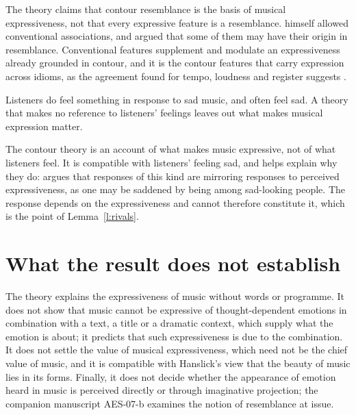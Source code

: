\documentclass{situationist-preprint}
\begin{document}
\begin{reply}
The theory claims that contour resemblance is the basis of musical expressiveness, not that every expressive feature is a resemblance. \citet{Kivy1980} himself allowed conventional associations, and argued that some of them may have their origin in resemblance. Conventional features supplement and modulate an expressiveness already grounded in contour, and it is the contour features that carry expression across idioms, as the agreement found for tempo, loudness and register suggests \citep{JuslinLaukka2003}.
\end{reply}

\begin{objection}\label{o:felt}
Listeners do feel something in response to sad music, and often feel sad. A theory that makes no reference to listeners' feelings leaves out what makes musical expression matter.
\end{objection}

\begin{reply}
The contour theory is an account of what makes music expressive, not of what listeners feel. It is compatible with listeners' feeling sad, and helps explain why they do: \citet{SDavies1994} argues that responses of this kind are mirroring responses to perceived expressiveness, as one may be saddened by being among sad-looking people. The response depends on the expressiveness and cannot therefore constitute it, which is the point of Lemma~\ref{l:rivals}.
\end{reply}

\section{What the result does not establish}

The theory explains the expressiveness of music without words or programme. It does not show that music cannot be expressive of thought-dependent emotions in combination with a text, a title or a dramatic context, which supply what the emotion is about; it predicts that such expressiveness is due to the combination. It does not settle the value of musical expressiveness, which need not be the chief value of music, and it is compatible with Hanslick's view that the beauty of music lies in its forms. Finally, it does not decide whether the appearance of emotion heard in music is perceived directly or through imaginative projection; the companion manuscript AES-07-b examines the notion of resemblance at issue.
\end{document}
